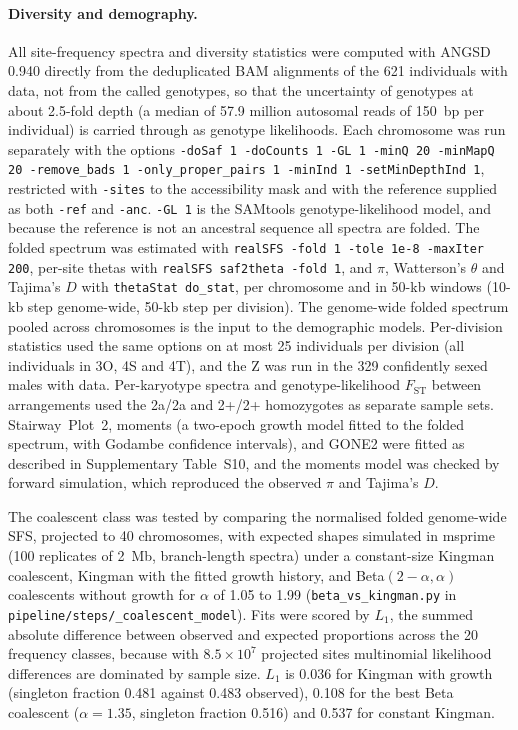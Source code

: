 \documentclass[11pt]{article}
\newcommand{\Fst}{F_\mathrm{ST}}
\begin{document}
\paragraph{Diversity and demography.}
All site-frequency spectra and diversity statistics were computed with ANGSD 0.940 \citep{korneliussen2014angsd}
directly from the deduplicated BAM alignments of the 621 individuals with data, not from the called genotypes, so that the
uncertainty of genotypes at about 2.5-fold depth (a median of 57.9 million autosomal reads of 150~bp per individual) is carried through as genotype likelihoods. Each chromosome was
run separately with the options \texttt{-doSaf 1 -doCounts 1 -GL 1 -minQ 20 -minMapQ 20 -remove\_bads 1
-only\_proper\_pairs 1 -minInd 1 -setMinDepthInd 1}, restricted with \texttt{-sites} to the accessibility mask and
with the reference supplied as both \texttt{-ref} and \texttt{-anc}. \texttt{-GL 1} is the SAMtools
genotype-likelihood model, and because the reference is not an ancestral sequence all spectra are folded. The
folded spectrum was estimated with \texttt{realSFS -fold 1 -tole 1e-8 -maxIter 200}, per-site thetas with
\texttt{realSFS saf2theta -fold 1}, and $\pi$, Watterson's $\theta$ and Tajima's $D$ with \texttt{thetaStat
do\_stat}, per chromosome and in 50-kb windows (10-kb step genome-wide, 50-kb step per division). The genome-wide
folded spectrum pooled across chromosomes is the input to the demographic models. Per-division statistics used the same options on at most 25 individuals per division (all individuals in 3O, 4S and 4T), and the Z was run in the 329
confidently sexed males with data. Per-karyotype spectra and genotype-likelihood $\Fst$ between arrangements used the 2a/2a and
2+/2+ homozygotes as separate sample sets. Stairway~Plot~2, moments (a two-epoch growth model fitted to the folded
spectrum, with Godambe confidence intervals), and GONE2 were fitted as described in Supplementary Table~S10, and
the moments model was checked by forward simulation, which reproduced the observed $\pi$ and Tajima's $D$.

The coalescent class was tested by comparing the normalised folded genome-wide SFS, projected to 40 chromosomes, with expected shapes simulated in msprime (100 replicates of 2~Mb, branch-length spectra) under a constant-size Kingman coalescent, Kingman with the fitted growth history, and Beta$(2-\alpha,\alpha)$ coalescents without growth for $\alpha$ of 1.05 to 1.99 (\texttt{beta\_vs\_kingman.py} in \texttt{pipeline/steps/\_coalescent\_model}). Fits were scored by $L_1$, the summed absolute difference between observed and expected proportions across the 20 frequency classes, because with $8.5\times10^{7}$ projected sites multinomial likelihood differences are dominated by sample size. $L_1$ is 0.036 for Kingman with growth (singleton fraction 0.481 against 0.483 observed), 0.108 for the best Beta coalescent ($\alpha=1.35$, singleton fraction 0.516) and 0.537 for constant Kingman.
\end{document}
